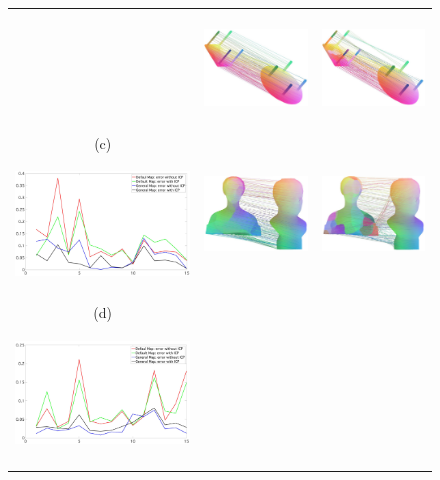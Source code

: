 \documentclass[acmtog,authorversion]{acmart}
\begin{document}
\begin{figure}
\begin{tabular}{c|c|c}
&\includegraphics[height=85pt]{FMAP-images/table-Source=157-Target=158-General-Basis-ZOOM.jpg}
&\includegraphics[height=85pt]{FMAP-images/table-Source=157-Target=158-Lapl-Eig-ZOOM.jpg}\\
(c)\includegraphics[height=105pt]{FMAP-images/bust-STATISTICS.jpg}
&\includegraphics[height=85pt]{FMAP-images/bust-Source=301-Target=314-General-Basis-ZOOM.jpg}
&\includegraphics[height=85pt]{FMAP-images/bust-Source=301-Target=314-Lapl-Eig-ZOOM.jpg}\\
(d)\includegraphics[height=105pt]{FMAP-images/human-STATISTICS.jpg}

\end{tabular}
\end{figure}
\end{document}

